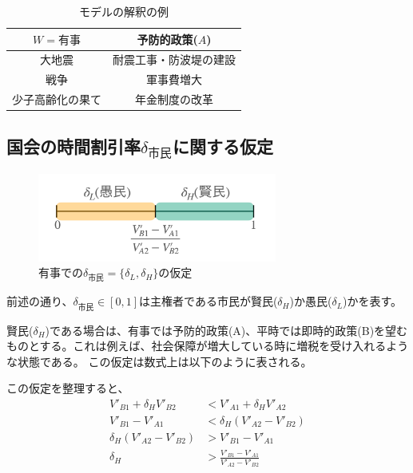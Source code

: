 \documentclass[main.tex]{subfiles}
\begin{document}
\begin{table}[htbp]
  \caption{モデルの解釈の例}
  \label{table:data_type}
  \centering
  \begin{tabular}{cc}
    \toprule
    $W=有事$ & 予防的政策($A$) \\
    \midrule
    大地震 & 耐震工事・防波堤の建設 \\
    戦争 & 軍事費増大 \\
    少子高齢化の果て & 年金制度の改革 \\
    \bottomrule
  \end{tabular}
\end{table}



\subsection{国会の時間割引率$\delta_{市民}$に関する仮定}

\begin{figure}[htbp]
  \centering
  \includegraphics[width=0.7\textwidth]{./image/assumption_citizen_discount_rate.png}
  \caption{有事での$\delta_{市民}=\lbrace \delta_L, \delta_H \rbrace$の仮定} 
  \label{fig:assumption_citizen_discount_rate}
\end{figure}


前述の通り、$\delta_{市民}\in[0,1]$は主権者である市民が賢民($\delta_H$)か愚民($\delta_L$)かを表す。

賢民($\delta_H$)である場合は、有事では予防的政策(A)、平時では即時的政策(B)を望むものとする。これは例えば、社会保障が増大している時に増税を受け入れるような状態である。
この仮定は数式上は以下のように表される。

この仮定を整理すると、
\begin{align*}
  V'_{B1} + \delta_H V'_{B2} &< V'_{A1} + \delta_H V'_{A2}\\
  V'_{B1}-V'_{A1}  &<  \delta_H (V'_{A2} - V'_{B2}) \\
  \delta_H (V'_{A2} - V'_{B2}) &> V'_{B1}-V'_{A1} \\
  \delta_H &> \frac{V'_{B1}-V'_{A1}}{V'_{A2} - V'_{B2}}
\end{align*}
\end{document}
